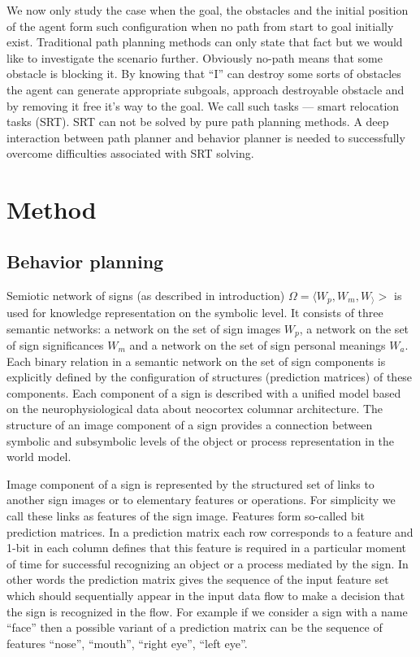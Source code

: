 \documentclass[procedia]{easychair}
\begin{document}
We now only study the case when the goal, the obstacles and the initial position of the agent form such configuration when no path from start to goal initially exist. Traditional path planning methods can only state that fact but we would like to investigate the scenario further. Obviously no-path means that some obstacle is blocking it. By knowing that ``I'' can destroy some sorts of obstacles the agent can generate appropriate subgoals, approach destroyable obstacle and by removing it free it's way to the goal. We call such tasks --- smart relocation tasks (SRT). SRT can not be solved by pure path planning methods. A deep interaction between path planner and behavior planner is needed to successfully overcome difficulties associated with SRT solving.

\section{Method}
\label{sect:method}
\subsection{Behavior planning}
\label{sect:beh}

Semiotic network of signs (as described in introduction) $\Omega=\langle W_p,W_m,W_\rangle>$ is used for knowledge representation on the symbolic level. It consists of three semantic networks: a network on the set of sign images $W_p$, a network on the set of sign significances $W_m$ and a network on the set of sign personal meanings $W_a$. Each binary relation in a semantic network on the set of sign components is explicitly defined by the configuration of structures (prediction matrices) of these components. Each component of a sign is described with a unified model based on the neurophysiological data about neocortex columnar architecture. The structure of an image component of a sign provides a connection between symbolic and subsymbolic levels of the object or process representation in the world model.

Image component of a sign is represented by the structured set of links to another sign images or to elementary features or operations. For simplicity we call these links as features of the sign image. Features form so-called bit prediction matrices. In a prediction matrix each row corresponds to a feature and 1-bit in each column defines that this feature is required in a particular moment of time for successful recognizing an object or a process mediated by the sign. In other words the prediction matrix gives the sequence of the input feature set which should sequentially appear in the input data flow to make a decision that the sign is recognized in the flow. For example if we consider a sign with a name ``face'' then a possible variant of a prediction matrix can be the sequence of features ``nose'', ``mouth'', ``right eye'', ``left eye''.
\end{document}
